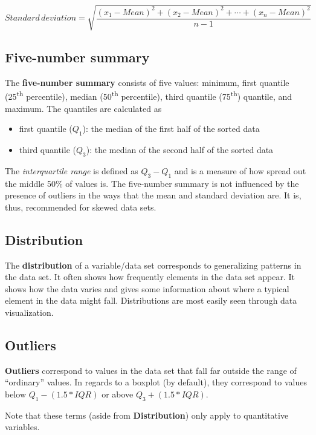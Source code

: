 \documentclass[]{tufte-book}
\providecommand{\tightlist}{%
  \setlength{\itemsep}{0pt}\setlength{\parskip}{0pt}}
\begin{document}
\[Standard \, deviation = \sqrt{\frac{(x_1 - Mean)^2 + (x_2 - Mean)^2 + \cdots + (x_n - Mean)^2}{n - 1}}\]

\subsection{Five-number summary}\label{five-number-summary}

The \textbf{five-number summary} consists of five values: minimum, first
quantile (25\textsuperscript{th} percentile), median
(50\textsuperscript{th} percentile), third quantile
(75\textsuperscript{th}) quantile, and maximum. The quantiles are
calculated as

\begin{itemize}
\tightlist
\item
  first quantile (\(Q_1\)): the median of the first half of the sorted
  data
\item
  third quantile (\(Q_3\)): the median of the second half of the sorted
  data
\end{itemize}

The \emph{interquartile range} is defined as \(Q_3 - Q_1\) and is a
measure of how spread out the middle 50\% of values is. The five-number
summary is not influenced by the presence of outliers in the ways that
the mean and standard deviation are. It is, thus, recommended for skewed
data sets.

\subsection{Distribution}\label{distribution}

The \textbf{distribution} of a variable/data set corresponds to
generalizing patterns in the data set. It often shows how frequently
elements in the data set appear. It shows how the data varies and gives
some information about where a typical element in the data might fall.
Distributions are most easily seen through data visualization.

\subsection{Outliers}\label{outliers}

\textbf{Outliers} correspond to values in the data set that fall far
outside the range of ``ordinary'' values. In regards to a boxplot (by
default), they correspond to values below \(Q_1 - (1.5 * IQR)\) or above
\(Q_3 + (1.5 * IQR)\).

Note that these terms (aside from \textbf{Distribution}) only apply to
quantitative variables.

\renewcommand{\bibname}{References}

% 
% 
\end{document}

